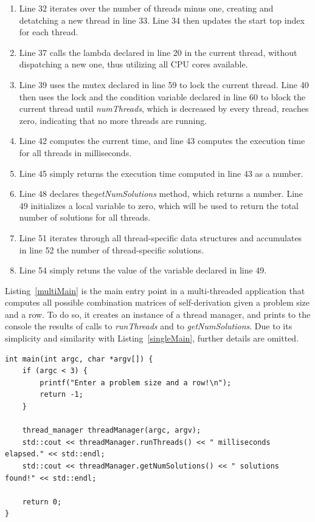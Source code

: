 \begin{enumerate}
\addtocounter{enumi}{4}
\item Line 32 iterates over the number of threads minus one, creating and detatching a new thread in line 33. Line 34 then updates the start top index for each thread.
\addtocounter{enumi}{4}
\item Line 37 calls the lambda declared in line 20 in the current thread, without dispatching a new one, thus utilizing all CPU cores available.
\addtocounter{enumi}{1}
\item Line 39 uses the mutex declared in line 59 to lock the current thread. Line 40 then uses the lock and the condition variable declared in line 60 to block the current thread until \emph{numThreads}, which is decreased by every thread, reaches zero, indicating that no more threads are running.
\addtocounter{enumi}{2}
\item Line 42 computes the current time, and line 43 computes the execution time for all threads in milliseconds.
\addtocounter{enumi}{2}
\item Line 45 simply returns the execution time computed in line 43 as a number.
\addtocounter{enumi}{2}
\item Line 48 declares the\emph{getNumSolutions} method, which returns a number. Line 49 initializes a local variable to zero, which will be used to return the total number of solutions for all threads.
\addtocounter{enumi}{2}
\item Line 51 iterates through all thread-specific data structures and accumulates in line 52 the number of thread-specific solutions.
\addtocounter{enumi}{2}
\item Line 54 simply retuns the value of the variable declared in line 49.
\end{enumerate}


Listing~\ref{multiMain} is the main entry point in a multi-threaded application that computes all possible combination matrices of self-derivation given a problem size and a row. To do so, it creates an instance of a thread manager, and prints to the console the results of calls to \emph{runThreads} and to \emph{getNumSolutions}. Due to its simplicity and similarity with Listing~\ref{singleMain}, further details are omitted.

\begin{lstlisting}[caption={A multi-threaded command line tool.},label={multiMain}]
int main(int argc, char *argv[]) {
    if (argc < 3) {
        printf("Enter a problem size and a row!\n");
        return -1;
    }

    thread_manager threadManager(argc, argv);
    std::cout << threadManager.runThreads() << " milliseconds elapsed." << std::endl;
    std::cout << threadManager.getNumSolutions() << " solutions found!" << std::endl;

    return 0;
}
\end{lstlisting}

